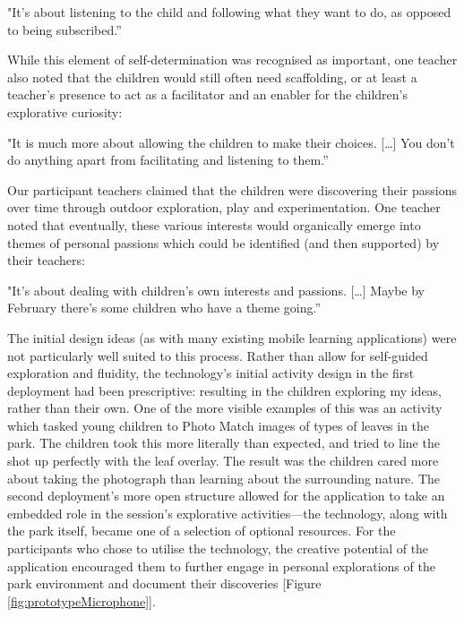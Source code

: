 \begin{displayquote}
"It's about listening to the child and following what they want to do, as opposed to being subscribed.”
\end{displayquote}

While this element of self-determination was recognised as important, one teacher also noted that the children would still often need scaffolding, or at least a teacher’s presence to act as a facilitator and an enabler for the children’s explorative curiosity:

\begin{displayquote}
"It is much more about allowing the children to make their choices. […] You don’t do anything apart from facilitating and listening to them.”
\end{displayquote}

Our participant teachers claimed that the children were discovering their passions over time through outdoor exploration, play and experimentation. One teacher noted that eventually, these various interests would organically emerge into themes of personal passions which could be identified (and then supported) by their teachers:

\begin{displayquote}
"It’s about dealing with children’s own interests and passions. […] Maybe by February there’s some children who have a theme going.”
\end{displayquote}

The initial design ideas (as with many existing mobile learning applications) were not particularly well suited to this process. Rather than allow for self-guided exploration and fluidity, the technology’s initial activity design in the first deployment had been prescriptive: resulting in the children exploring my ideas, rather than their own. One of the more visible examples of this was an activity which tasked young children to Photo Match images of types of leaves in the park. The children took this more literally than expected, and tried to line the shot up perfectly with the leaf overlay. The result was the children cared more about taking the photograph than learning about the surrounding nature. The second deployment’s more open structure allowed for the application to take an embedded role in the session’s explorative activities---the technology, along with the park itself, became one of a selection of optional resources. For the participants who chose to utilise the technology, the creative potential of the application encouraged them to further engage in personal explorations of the park environment and document their discoveries [Figure \ref{fig:prototypeMicrophone}].

